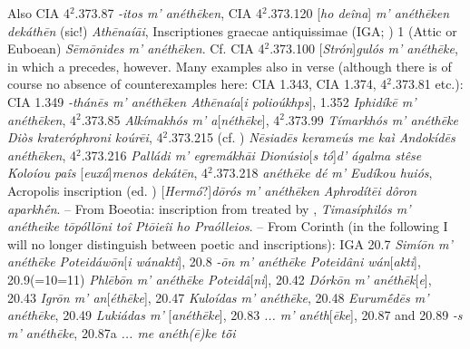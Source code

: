 Also CIA 4$^2$.373.87 \textit{-itos \emph{m'} anéthēken}, CIA 4$^2$.373.120 {[}\textit{ho deîna}{]} \textit{\emph{m'} anéthēken dekáthēn} (sic!) \textit{Athēnaíāi}, Inscriptiones graecae antiquissimae (IGA; \citealp{Roehl1882}) 1 (Attic or Euboean) \textit{Sēmōnides \emph{m'} anéthēken}. Cf. CIA 4$^2$.373.100 {[}\textit{Strón}{]}\textit{gulós \emph{m'} anéthēke}, in which a  precedes, however. Many examples also in verse (although there is of course no absence of counterexamples\label{versedeviations} here: CIA 1.343, CIA 1.374, 4$^2$.373.81 etc.): CIA 1.349 \textit{-thánēs \emph{m'} anéthēken Athēnaía}{[}\textit{i polioúkhps}{]}, 1.352 \textit{Iphidíkē \emph{m'} anéthēken}, 4$^2$.373.85 \textit{Alkímakhós \emph{m'} a}{[}\textit{néthēke}{]}, 4$^2$.373.99 \textit{Tímarkhós \emph{m'} anéthēke Diòs krateróphroni koúrēi}, 4$^2$.373.215 (cf. \citealp[145]{Studniczka1887}) \textit{Nēsiadēs kerameús \emph{me} kaì Andokídēs anéthēken}, 4$^2$.373.216 \textit{Palládi \emph{m'} egremákhāi Dionúsio}{[}\textit{s tó}{]}\textit{d' ágalma stêse Koloíou paîs }{[}\textit{euxá}{]}\textit{menos dekátēn}, 4$^2$.373.218 \textit{ané\-thē\-ke dé \emph{m'} Eudíkou huiós}, Acropolis inscription (ed. \citealp[160]{Foucart1889}) {[}\textit{Hermó}?{]}\textit{dō\-rós \emph{m'} anéthēken Aphrodítēi dôron aparkhḗn}. -- From Boeotia: inscription from \citet{Reinach1885} treated by \citet[123--125]{Kretschmer1891}, \textit{Timasíphilós \emph{m'} anétheike tōpóllōni toî Ptōieîi ho Praólleios}. -- From Corinth (in the following I will no longer distinguish between poetic and  inscriptions): IGA 20.7 \textit{Simíōn \emph{m'} anéthēke Poteidáwōn}{[}\textit{i wánakti}{]}, 20.8 \textit{-ōn \emph{m'} anéthēke Poteidâni wán}{[}\textit{akti}{]}, 20.9(=10=11) \textit{Phlēbōn \emph{m'} anéthēke Poteidâ}{[}\textit{ni}{]}, 20.42 \textit{Dórkōn \emph{m'} anéthēk}{[}\textit{e}{]}, 20.43 \textit{Igrōn \emph{m'} an}{[}\textit{é\-thē\-ke}{]}, 20.47 \textit{Kuloídas \emph{m'} anéthēke}, 20.48 \textit{Eurumḗdēs \emph{m'} anéthēke}, 20.49 \textit{Lukiádas \emph{m'} }{[}\textit{anéthēke}{]}, 20.83 \textit{... \emph{m'} anéth}{[}\textit{ēke}{]}, 20.87 and 20.89 \textit{-s \emph{m'} anéthēke}, 20.87a \textit{... \emph{me} anéth(ē)ke tȭi}
